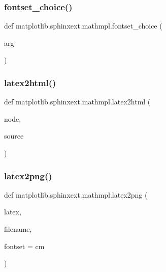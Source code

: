 \subsubsection{\texorpdfstring{fontset\+\_\+choice()}{fontset\_choice()}}
{\footnotesize\ttfamily def matplotlib.\+sphinxext.\+mathmpl.\+fontset\+\_\+choice (\begin{DoxyParamCaption}\item[{}]{arg }\end{DoxyParamCaption})}

\mbox{\label{namespacematplotlib_1_1sphinxext_1_1mathmpl_a3524613a2ab8b0effc795d00fdbb79f0}} 
\subsubsection{\texorpdfstring{latex2html()}{latex2html()}}
{\footnotesize\ttfamily def matplotlib.\+sphinxext.\+mathmpl.\+latex2html (\begin{DoxyParamCaption}\item[{}]{node,  }\item[{}]{source }\end{DoxyParamCaption})}

\mbox{\label{namespacematplotlib_1_1sphinxext_1_1mathmpl_a5dd71e3e051c13abe58c56f041e3f5be}} 
\subsubsection{\texorpdfstring{latex2png()}{latex2png()}}
{\footnotesize\ttfamily def matplotlib.\+sphinxext.\+mathmpl.\+latex2png (\begin{DoxyParamCaption}\item[{}]{latex,  }\item[{}]{filename,  }\item[{}]{fontset = {\ttfamily \textquotesingle{}cm\textquotesingle{}} }\end{DoxyParamCaption})}

